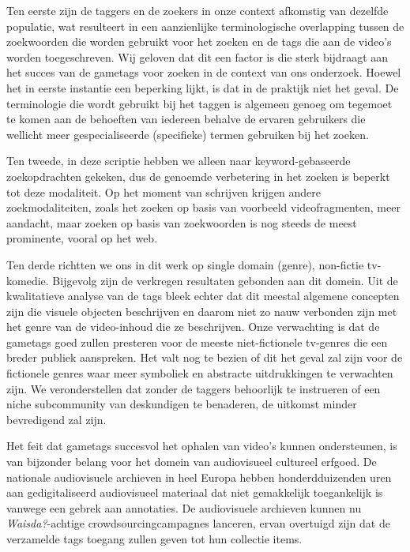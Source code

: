 Ten eerste zijn de taggers en de zoekers in onze context afkomstig van dezelfde populatie, wat resulteert in een aanzienlijke terminologische overlapping tussen de zoekwoorden die worden
gebruikt voor het zoeken en de tags die aan de video's worden toegeschreven. Wij geloven dat dit een factor is die sterk bijdraagt aan het succes van de gametags voor zoeken in de context van ons
onderzoek. Hoewel het in eerste instantie een beperking lijkt, is dat in de praktijk niet het geval. De terminologie die wordt gebruikt bij het taggen is algemeen genoeg om tegemoet te komen aan de
behoeften van iedereen behalve de ervaren gebruikers die wellicht meer gespecialiseerde (specifieke) termen gebruiken bij het zoeken.

Ten tweede, in deze scriptie hebben we alleen naar keyword-gebaseerde zoekopdrachten gekeken, dus de genoemde verbetering in het zoeken is beperkt tot deze modaliteit. Op het moment van schrijven krijgen andere zoekmodaliteiten, zoals het zoeken op basis van voorbeeld videofragmenten, meer aandacht, maar zoeken op basis van zoekwoorden is nog steeds de meest prominente, vooral op het web.

Ten derde richtten we ons in dit werk op single domain (genre), non-fictie tv-komedie. Bijgevolg zijn de verkregen resultaten gebonden aan dit domein. Uit de kwalitatieve analyse van de tags bleek
echter dat dit meestal algemene concepten zijn die visuele objecten beschrijven en daarom niet zo nauw verbonden zijn met het genre van de video-inhoud die ze beschrijven. Onze verwachting is dat
de gametags goed zullen presteren voor de meeste niet-fictionele tv-genres die een breder publiek aanspreken. Het valt nog te bezien of dit het geval zal zijn voor de fictionele genres waar meer
symboliek en abstracte uitdrukkingen te verwachten zijn. We veronderstellen dat zonder de taggers behoorlijk te instrueren of een niche subcommunity van deskundigen te benaderen, de uitkomst
minder bevredigend zal zijn.

Het feit dat gametags succesvol het ophalen van video's kunnen ondersteunen, is van bijzonder belang voor het domein van audiovisueel cultureel erfgoed. De nationale audiovisuele archieven in heel Europa hebben honderdduizenden uren aan gedigitaliseerd audiovisueel materiaal dat niet gemakkelijk toegankelijk is vanwege een gebrek aan annotaties. De audiovisuele archieven kunnen nu \textit{Waisda?}-achtige crowdsourcingcampagnes lanceren, ervan overtuigd zijn dat de verzamelde tags toegang zullen geven tot hun collectie items.